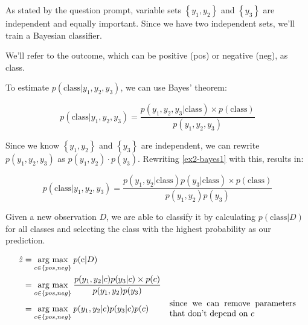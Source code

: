 \documentclass[12pt]{article}
\begin{document}
\begin{enumerate}[leftmargin=\labelsep,resume]
          As stated by the question prompt, variable sets \(\left\{y_1, y_2\right\}\)
          and \(\left\{y_3\right\}\) are independent and equally important.
          Since we have two independent sets, we'll train a Bayesian classifier.

          We'll refer to the outcome, which can be positive (pos) or
          negative (neg), as class.

          To estimate $p(\text{class} | y_1, y_2, y_3)$, we can use Bayes' theorem:

          \begin{equation}\label{ex2-bayes1}
              p(\text{class}| y_1, y_2, y_3) = \frac{p(y_1, y_2, y_3 | \text{class}) \times p(\text{class})}{p(y_1, y_2, y_3)}
          \end{equation}

          Since we know $\left\{y_1, y_2\right\}$ and $\left\{y_3\right\}$ are independent,
          we can rewrite $p(y_1, y_2, y_3)$ as $p(y_1, y_2) \cdot p(y_3)$.
          Rewriting \eqref{ex2-bayes1} with this, results in:

          \begin{equation}\label{ex2-bayes2}
              p(\text{class}| y_1, y_2, y_3) = \frac{p(y_1, y_2 | \text{class}) p(y_3 | \text{class}) \times p(\text{class})}{p(y_1, y_2)p(y_3)}
          \end{equation}

          Given a new observation $D$, we are able to classify it by calculating
          $p(\text{class}|D)$ for all classes and selecting the class with the
          highest probability as our prediction.

          $$
              \begin{aligned}
                  \hat{z} & = \underset{c \in \{pos, neg\}}{\text{arg max}} \medspace p(\text{c} | D)                                                                                                                           \\
                          & = \underset{c \in \{pos, neg\}}{\text{arg max}} \medspace \frac{p(y_1, y_2 | c) p(y_3 | c) \times p(c)}{p(y_1, y_2)p(y_3)}                                                                          \\
                          & = \underset{c \in \{pos, neg\}}{\text{arg max}} \medspace p(y_1, y_2 | c) p(y_3 | c) p(c)                                  & \parbox{15em}{since we can remove parameters that don't depend on $c$}
              \end{aligned}
          $$



\end{enumerate}
\end{document}
